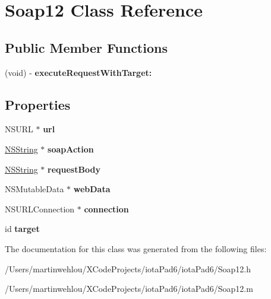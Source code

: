 \hypertarget{interface_soap12}{
\section{Soap12 Class Reference}
\label{interface_soap12}
}
\subsection*{Public Member Functions}
\begin{DoxyCompactItemize}
\item 
\hypertarget{interface_soap12_ad0f86da89e9bc23c41d99a2f388c5f0a}{
(void) -\/ {\bfseries executeRequestWithTarget:}}
\label{interface_soap12_ad0f86da89e9bc23c41d99a2f388c5f0a}

\end{DoxyCompactItemize}
\subsection*{Properties}
\begin{DoxyCompactItemize}
\item 
\hypertarget{interface_soap12_a1d5abd32ffaa6944b5da1e24a05780dc}{
NSURL $\ast$ {\bfseries url}}
\label{interface_soap12_a1d5abd32ffaa6944b5da1e24a05780dc}

\item 
\hypertarget{interface_soap12_a92400721e9143988d99dd259fa8117e2}{
\hyperlink{class_n_s_string}{NSString} $\ast$ {\bfseries soapAction}}
\label{interface_soap12_a92400721e9143988d99dd259fa8117e2}

\item 
\hypertarget{interface_soap12_a3123d7ad91eab5a99254ae1f9e96fb0e}{
\hyperlink{class_n_s_string}{NSString} $\ast$ {\bfseries requestBody}}
\label{interface_soap12_a3123d7ad91eab5a99254ae1f9e96fb0e}

\item 
\hypertarget{interface_soap12_a8395cd86228bfa5fcf83e063f906e925}{
NSMutableData $\ast$ {\bfseries webData}}
\label{interface_soap12_a8395cd86228bfa5fcf83e063f906e925}

\item 
\hypertarget{interface_soap12_a2c276d968b888f959a9b2096ada1ba51}{
NSURLConnection $\ast$ {\bfseries connection}}
\label{interface_soap12_a2c276d968b888f959a9b2096ada1ba51}

\item 
\hypertarget{interface_soap12_a7f2a18551aa55c8ca00d90478b0546d8}{
id {\bfseries target}}
\label{interface_soap12_a7f2a18551aa55c8ca00d90478b0546d8}

\end{DoxyCompactItemize}


The documentation for this class was generated from the following files:\begin{DoxyCompactItemize}
\item 
/Users/martinwehlou/XCodeProjects/iotaPad6/iotaPad6/Soap12.h\item 
/Users/martinwehlou/XCodeProjects/iotaPad6/iotaPad6/Soap12.m\end{DoxyCompactItemize}
